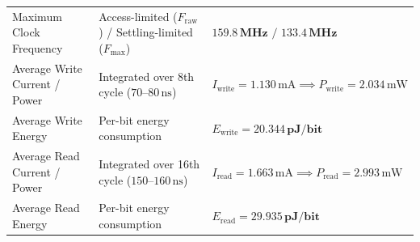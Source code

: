 \documentclass[10pt,a4paper,titlepage]{article}
\begin{document}
\begin{table}[h!]
\begin{tabularx}{\textwidth}{lXl}
Maximum Clock Frequency & Access-limited ($F_{\text{raw}}$) / Settling-limited ($F_{\text{max}}$) & $\mathbf{159.8\,\text{MHz}} \text{ / } \mathbf{133.4\,\text{MHz}}$ \\
Average Write Current / Power & Integrated over 8th cycle ($70\text{--}80\,\text{ns}$) & $I_{\text{write}} = 1.130\,\text{mA} \implies P_{\text{write}} = 2.034\,\text{mW}$ \\
Average Write Energy & Per-bit energy consumption & $E_{\text{write}} = \mathbf{20.344\,\text{pJ/bit}}$ \\
Average Read Current / Power & Integrated over 16th cycle ($150\text{--}160\,\text{ns}$) & $I_{\text{read}} = 1.663\,\text{mA} \implies P_{\text{read}} = 2.993\,\text{mW}$ \\
Average Read Energy & Per-bit energy consumption & $E_{\text{read}} = \mathbf{29.935\,\text{pJ/bit}}$ \\
\bottomrule
\end{tabularx}
\end{table}
\end{document}
